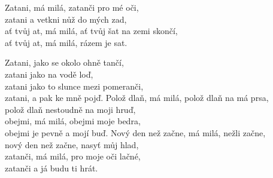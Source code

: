 \ve
{}Zatani, má milá, zatanči pro mé oči,\\
zatani a vetkni nůž do mých zad,\\
ať tvůj at, má milá, ať tvůj šat na zemi skončí,\\
ať tvůj at, má milá, rázem je sat.

\cho
{}Zatani, jako se okolo ohně tančí,\\
zatani jako na vodě loď,\\
zatani jako to slunce mezi pomeranči,\\
zatani, a pak ke mně pojď.
\ve
Polož dlaň, má milá, polož dlaň na má prsa,\\
polož dlaň nestoudně na moji hruď,\\
obejmi, má milá, obejmi moje bedra,\\
obejmi je pevně a mojí buď.
\ve
Nový den než začne, má milá, nežli začne,\\
nový den než začne, nasyť můj hlad,\\
zatanči, má milá, pro moje oči lačné,\\
zatanči a já budu ti hrát.

\esong